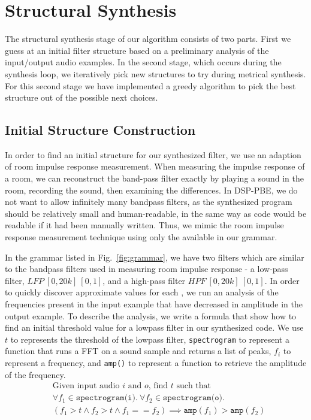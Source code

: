 \section{Structural Synthesis}
\label{sec:struct}

The structural synthesis stage of our algorithm consists of two parts.
First we guess at an initial filter structure based on a preliminary analysis of the input/output audio examples.
In the second stage, which occurs during the synthesis loop, we iteratively pick new structures to try during metrical synthesis.
For this second stage we have implemented a greedy algorithm to pick the best structure out of the possible next choices.

\subsection{Initial Structure Construction}
\label{sec:initStruct}
In order to find an initial structure for our synthesized filter, we use an adaption of room impulse response measurement.
When measuring the impulse response of a room, we can reconstruct the band-pass filter exactly by playing a sound in the room, recording the sound, then examining the differences.
In DSP-PBE, we do not want to allow infinitely many bandpass filters, as the synthesized program should be relatively small and human-readable, in the same way as code would be readable if it had been manually written.
Thus, we mimic the room impulse response measurement technique using only the available \dspnode in our grammar.

In the grammar listed in Fig.~\ref{fig:grammar}, we have two filters which are similar to the bandpass filters used in measuring room impulse response - a low-pass filter, $LFP \ [0,20k]\ [0,1]$, and a high-pass filter $HPF\ [0,20k]\ [0,1]$.
In order to quickly discover approximate values for each \dspnode, we run an analysis of the frequencies present in the input example that have decreased in amplitude in the output example.
To describe the analysis, we write a formula that show how to find an initial threshold value for a lowpass filter in our synthesized code.
We use $t$ to represents the threshold of the lowpass filter, \texttt{spectrogram} to represent a function that runs a FFT on a sound sample and returns a list of peaks, $f_i$ to represent a frequency, and \texttt{amp()} to represent a function to retrieve the amplitude of the frequency. 
%
\begin{align*}
&\text{Given input audio }i\text{ and }o\text{, find }t\text{ such that} \\
&\forall f_1 \in  \texttt{spectrogram(i)}.\ \forall f_2 \in \texttt{spectrogram(o)}. \\
&(f_1 > t \land  f_2 > t \land f_1 == f_2) \implies \texttt{amp}(f_1) > \texttt{amp}(f_2)
\end{align*}


